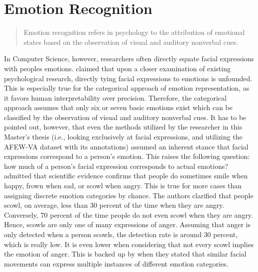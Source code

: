 
\section{Emotion Recognition}

\begin{quote}
    Emotion recognition refers in psychology to the attribution of emotional states based on the observation of visual and auditory nonverbal cues. \citep[~p. 3935]{Baenziger:2014:MeasuringERAbility}
\end{quote}
In Computer Science, however, researchers often directly equate facial expressions with peoples emotions. \citet{Barrett:2019:EmotionalFromFacialMovements} claimed that upon a closer examination of existing psychological research, directly tying facial expressions to emotions is unfounded. This is especially true for the categorical approach of emotion representation, as it favors human interpretability over precision. Therefore, the categorical approach assumes that only six or seven basic emotions exist which can be classified by the observation of visual and auditory nonverbal cues.
\newline\newline
It has to be pointed out, however, that even the methods utilized by the researcher in this Master's thesis (i.e., looking exclusively at facial expressions, and utilizing the AFEW-VA dataset with its annotations) assumed an inherent stance that facial expressions correspond to a person’s emotion. This raises the following question: how much of a person's facial expression corresponds to actual emotions?
\newline\newline
\citet{Barrett:2019:EmotionalFromFacialMovements} admitted that scientific evidence confirms that people do sometimes smile when happy, frown when sad, or scowl when angry. This is true for more cases than assigning discrete emotion categories by chance. The authors clarified that people scowl, on average, less than 30 percent of the time when they are angry. Conversely, 70 percent of the time people do not even scowl when they are angry. Hence, scowls are only one of many expressions of anger. Assuming that anger is only detected when a person scowls, the detection rate is around 30 percent, which is really low. It is even lower when considering that not every scowl implies the emotion of anger. This is backed up by \citet{Barrett:2019:EmotionalFromFacialMovements} when they stated that similar facial movements can express multiple instances of different emotion categories.
